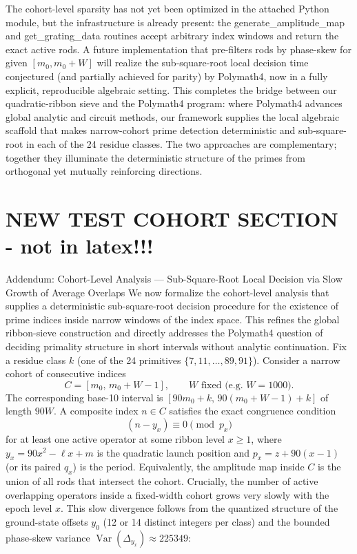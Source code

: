 \documentclass[11pt,a4paper]{article}
\begin{document}
The cohort-level sparsity has not yet been optimized in the attached Python module, but the infrastructure is already present: the generate_amplitude_map and get_grating_data routines accept arbitrary index windows and return the exact active rods. A future implementation that pre-filters rods by phase-skew for given $  [m_0,m_0+W]  $ will realize the sub-square-root local decision time conjectured (and partially achieved for parity) by Polymath4, now in a fully explicit, reproducible algebraic setting.
This completes the bridge between our quadratic-ribbon sieve and the Polymath4 program: where Polymath4 advances global analytic and circuit methods, our framework supplies the local algebraic scaffold that makes narrow-cohort prime detection deterministic and sub-square-root in each of the 24 residue classes. The two approaches are complementary; together they illuminate the deterministic structure of the primes from orthogonal yet mutually reinforcing directions.



\section{NEW TEST COHORT SECTION - not in latex!!!}

Addendum: Cohort-Level Analysis — Sub-Square-Root Local Decision via Slow Growth of Average Overlaps
We now formalize the cohort-level analysis that supplies a deterministic sub-square-root decision procedure for the existence of prime indices inside narrow windows of the index space. This refines the global ribbon-sieve construction and directly addresses the Polymath4 question of deciding primality structure in short intervals without analytic continuation.
Fix a residue class $  k  $ (one of the 24 primitives $  \{7,11,\dots,89,91\}  $). Consider a narrow cohort of consecutive indices
$$C = [m_0,\, m_0 + W - 1],\qquad W\text{ fixed (e.g.\ }W=1000\text{)}.$$
The corresponding base-10 interval is $  [90m_0 + k,\, 90(m_0 + W - 1) + k]  $ of length $  90W  $.
A composite index $  n\in C  $ satisfies the exact congruence condition
$$(n - y_x) \equiv 0 \pmod{p_x}$$
for at least one active operator at some ribbon level $  x \geq 1  $, where $  y_x = 90x^2 - \ell x + m  $ is the quadratic launch position and $  p_x = z + 90(x-1)  $ (or its paired $  q_x  $) is the period. Equivalently, the amplitude map inside $  C  $ is the union of all rods that intersect the cohort.
Crucially, the number of active overlapping operators inside a fixed-width cohort grows very slowly with the epoch level $  x  $. This slow divergence follows from the quantized structure of the ground-state offsets $  y_0  $ (12 or 14 distinct integers per class) and the bounded phase-skew variance $  \operatorname{Var}(\Delta_{y_x}) \approx 225349  $:
\end{document}
